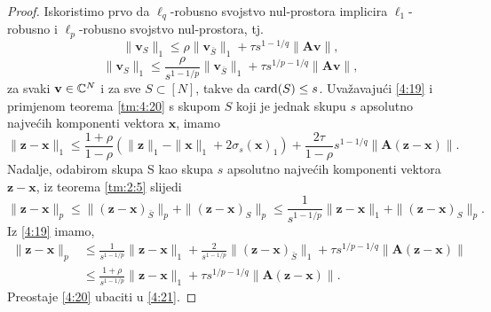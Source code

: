 \documentclass[a4paper,twoside,12pt]{memoir} %
\newcommand{\vect}[1]{\mathbf{#1}}
\renewcommand{\vec}{\vect}
\newcommand{\card}{\text{\normalfont{card}}}
\newcommand{\norm}[1]{\|{#1}\|}
\begin{document}
\begin{proof}
    Iskoristimo prvo da $\ell_q$-robusno svojstvo nul-prostora implicira $\ell_1$-robusno i $\ell_p$-robusno svojstvo nul-prostora, tj.
    \begin{equation}\label{4:18}
        \norm{\vec v_S}_1 \leq \rho \norm{\vec v_{\bar S}}_1 + \tau s^{1-1/q} \norm{\vec{Av}},
    \end{equation}
    \begin{equation}\label{4:19}
        \norm{\vec v_S}_1 \leq \frac{\rho}{s^{1-1/p}} \norm{\vec v_{\bar S}}_1 + \tau s^{1/p - 1/q} \norm{\vec{Av}},
    \end{equation}
    za svaki $\vec v \in \C^N$ i za sve $S \subset [N]$, takve da $\card(S) \leq s$. Uva\v{z}avaju\'ci \eqref{4:19} i primjenom teorema \ref{tm:4:20} s skupom $S$ koji je jednak skupu $s$ apsolutno najve\'cih komponenti vektora $\vec x$, imamo
    \begin{equation}\label{4:20}
        \norm{\vec z - \vec x}_1 \leq \frac{1+\rho}{1-\rho}(\norm{\vec z }_1 - \norm{\vec x}_1 + 2 \sigma_s(\vec x)_1)+ \frac{2 \tau}{1 - \rho}s^{1-1/q} \norm{\vec A (\vec z - \vec x)}.
    \end{equation}
    Nadalje, odabirom skupa S kao skupa $s$ apsolutno najve\'cih komponenti vektora $\vec z - \vec x$, iz teorema \ref{tm:2:5} slijedi
    \begin{equation*}
        \norm{\vec z - \vec x}_p \leq \norm{(\vec z - \vec x)_{\bar S}}_p + \norm{(\vec z - \vec x)_S}_p \leq \frac{1}{s^{1-1/p}}\norm{\vec z - \vec x}_1 + \norm{(\vec z - \vec x)_S}_p.
    \end{equation*}
    Iz \eqref{4:19} imamo,
    \begin{align}\label{4:21}
        \norm{\vec z - \vec x}_p &\leq \frac{1}{s^{1-1/p}} \norm{\vec z - \vec x}_1 + \frac{2}{s^{1-1/p}} \norm{(\vec z - \vec x)_{\bar S}}_1 + \tau s^{1/p - 1/q} \norm{\vec A (\vec z - \vec x)}\nonumber \\
        &\leq  \frac{1+\rho}{s^{1-1/p}}  \norm{\vec z - \vec x}_1 + \tau s^{1/p - 1/q} \norm{ \vec A (\vec z - \vec x)}.
    \end{align}
    Preostaje \eqref{4:20} ubaciti u \eqref{4:21}.
\end{proof}
\end{document}
